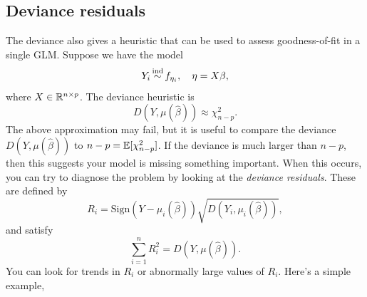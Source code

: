 \subsection{Deviance residuals}

The deviance also gives a heuristic that can be used to assess goodness-of-fit in a single GLM. Suppose we have the model
\[Y_i \simind f_{\eta_i}, \quad \eta = X\beta,\]
where $X \in \mathbb{R}^{n \times p}$. The deviance heuristic is
\[D(Y,\mu(\hat{\beta})) \approx \chi^2_{n-p}. \]
The above approximation may fail, but it is useful to compare the deviance $D(Y, \mu(\hat{\beta}))$ to $n-p = {\mathbb E}[\chi^2_{n-p}]$. If the deviance is much larger than $n-p$, then this suggests your model is missing something important. When this occurs, you can try to diagnose the problem by looking at the \emph{deviance residuals}. These are defined by
\[R_i = \mathrm{Sign}(Y-\mu_i(\hat{\beta}))\sqrt{D(Y_i, \mu_i(\hat{\beta}))}, \]
and satisfy
\[\sum_{i=1}^n R_i^2 = D(Y,\mu(\hat{\beta})). \]
You can look for trends in $R_i$ or abnormally large values of $R_i$. Here's a simple example,
